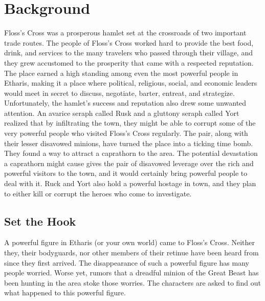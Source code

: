 \documentclass[10pt,a4paper,twoside,twocolumn,openany,bg=print,nodeprecatedcode]{dndbook}
\begin{document}
\section{Background}
Floss's Cross was a prosperous hamlet set at the crossroads of two important trade routes. The people of Floss's Cross worked hard to provide the best food, drink, and services to the many travelers who passed through their village, and they grew accustomed to the prosperity that came with a respected reputation. The place earned a high standing among even the most powerful people in Etharis, making it a place where political, religious, social, and economic leaders would meet in secret to discuss, negotiate, barter, entreat, and strategize.
Unfortunately, the hamlet's success and reputation also drew some unwanted attention. An avarice seraph called Rusk and a gluttony seraph called Yort realized that by infiltrating the town, they might be able to corrupt some of the very powerful people who visited Floss's Cross regularly. The pair, along with their lesser disavowed minions, have turned the place into a ticking time bomb.
They found a way to attract a caprathorn to the area. The potential devastation a caprathorn might cause gives the pair of disavowed leverage over the rich and powerful visitors to the town, and it would certainly bring powerful people to deal with it. Ruck and Yort also hold a powerful hostage in town, and they plan to either kill or corrupt the heroes who come to investigate.
\subsection{Set the Hook}
A powerful figure in Etharis (or your own world) came to Floss's Cross. Neither they, their bodyguards, nor other members of their retinue have been heard from since they first arrived. The disappearance of such a powerful figure has many people worried. Worse yet, rumors that a dreadful minion of the Great Beast has been hunting in the area stoke those worries. The characters are asked to find out what happened to this powerful figure.
\end{document}
